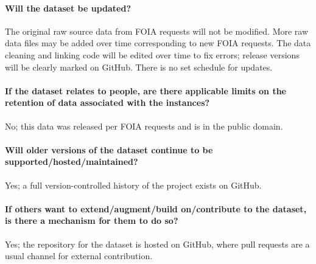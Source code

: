 \paragraph{Will the dataset be updated?}
The original raw source data from FOIA requests will not be modified. More raw
data files may be added over time corresponding to new FOIA requests. The data
cleaning and linking code will be edited over time to fix errors; release
versions will be clearly marked on GitHub. There is no set schedule for updates.

\paragraph{If the dataset relates to people, are there applicable limits on the retention of data associated with the instances?}
No; this data was released per FOIA requests and is in the public domain.

\paragraph{Will older versions of the dataset continue to be supported/hosted/maintained?}
Yes; a full version-controlled history of the project exists on GitHub.

\paragraph{If others want to extend/augment/build on/contribute to the dataset, is there a mechanism for them to do so?}
Yes; the repository for the dataset is hosted on GitHub, where pull requests are a usual channel for external contribution.
